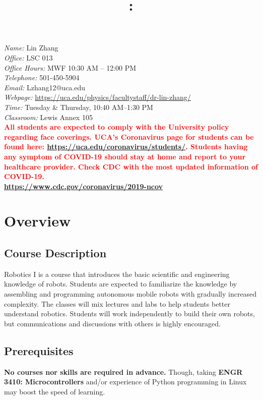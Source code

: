 \documentclass[11pt,letterpaper]{article}
\title{\Large\bfseries \coursecode: \coursetitle \\[0.1cm] \semester}
\author{}
\date{}
\makeatletter
\newcommand{\lefthead}[2]{\noindent{\large\textbf{#1}\hfill\\[#2]}}
\newcommand{\instructor}{Lin Zhang}
\newcommand{\office}{LSC 013}
\newcommand{\email}{Lzhang12@uca.edu}
\newcommand{\officehours}{MWF 10:30 AM -- 12:00 PM}
\newcommand{\classroom}{Lewis Annex 105}
\newcommand{\classtime}{Tuesday \& Thursday, 10:40 AM--1:30 PM}
\newcommand{\telephone}{501-450-5904}
\newcommand{\webpage}{\href{https://uca.edu/physics/facultystaff/dr-lin-zhang/}{https://uca.edu/physics/facultystaff/dr-lin-zhang/}}
\makeatother
\begin{document}
\maketitle
\thispagestyle{empty}
\vspace{-2cm}


\lefthead{Instructor}{0.3cm}
\indent \emph{Name:} \instructor \\
\indent \emph{Office:} \office \\
\indent \emph{Office Hours:} \officehours \\
\indent \emph{Telephone:} \telephone \\
\indent \emph{Email:} \email \\
\indent \emph{Webpage:} \webpage \\

\lefthead{Class \& Lab}{0.3cm}
\indent \emph{Time:} \classtime \\
\indent \emph{Classroom:} \classroom \\[0.3cm]


\noindent \textbf{\textcolor{red}{All students are expected to comply with the University policy regarding face coverings. UCA’s Coronavirus page for students can be found here: \href{https://uca.edu/coronavirus/students/}{https://uca.edu/coronavirus/students/}. Students having any symptom of COVID-19 should stay at home and report to your healthcare provider. Check CDC with the most updated information of COVID-19. \\\href{https://www.cdc.gov/coronavirus/2019-ncov}{https://www.cdc.gov/coronavirus/2019-ncov}}} 

\section*{Overview}
\subsection*{Course Description}
Robotics I is a course that introduces the basic scientific and engineering knowledge of robots. Students are expected to familiarize the knowledge by assembling and programming autonomous mobile robots with gradually increased complexity. The classes will mix lectures and labs to help students better understand robotics. Students will work independently to build their own robots, but communications and discussions with others is highly encouraged. 

\subsection*{Prerequisites}
\textbf{No courses nor skills are required in advance.} Though, taking \textbf{ENGR 3410: Microcontrollers} and/or experience of Python programming in Linux may boost the speed of learning. 
\end{document}
